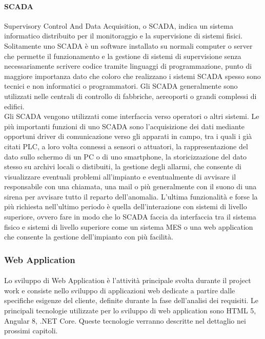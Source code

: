   \paragraph{SCADA}
  Supervisory Control And Data Acquisition, o SCADA, indica un sistema informatico distribuito 
  per il monitoraggio e la supervisione di sistemi fisici. Solitamente uno SCADA è un software installato su normali computer 
  o server che permette il funzionamento e la gestione di sistemi di supervisione senza necessariamente scrivere codice 
  tramite linguaggi di programmazione, punto di maggiore importanza dato che coloro che realizzano i sistemi SCADA spesso 
  sono tecnici e non informatici o programmatori. Gli SCADA generalmente sono utilizzati nelle centrali di controllo di fabbriche, 
  aereoporti o grandi complessi di edifici.\\
  Gli SCADA vengono utilizzati come interfaccia verso operatori o altri sistemi. Le più importanti funzioni di uno SCADA 
  sono l'acquisizione dei dati mediante opportuni driver di comunicazione verso gli apparati in campo, tra i quali 
  i già citati PLC, a loro volta connessi a sensori o attuatori, la rappresentazione del dato sullo schermo di un PC o di 
  uno smartphone, la storicizzazione del dato stesso su archivi locali o distibuiti, la gestione degli allarmi, che consente 
  di visualizzare eventuali problemi all'impianto e eventualmente di avvisare il responsabile con una chiamata, una mail o più 
  generalmente con il suono di una sirena per avvisare tutto il reparto dell'anomalia. L'ultima funzionalità e forse la più 
  richiesta nell'ultimo periodo è quella dell'interazione con sistemi di livello superiore, ovvero fare in modo che lo 
  SCADA faccia da interfaccia tra il sistema fisico e sistemi di livello superiore come un sistema MES o una web application 
  che consente la gestione dell'impianto con più facilità.
  \subsubsection{Web Application}
  \paragraph{}
  Lo sviluppo di Web Application è l'attività principale svolta durante il project work e consiste nello 
  sviluppo di applicazioni web dedicate a partire dalle specifiche esigenze del cliente, definite durante la 
  fase dell'analisi dei requisiti. Le principali tecnologie utilizzate per lo sviluppo di web application sono 
  HTML 5, Angular 8, .NET Core. Queste tecnologie verranno descritte nel dettaglio nei prossimi capitoli.
